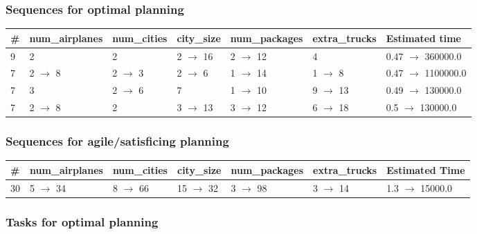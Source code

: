 \documentclass{article}
\begin{document}
                            \subsubsection*{Sequences for optimal planning}

                            \begin{center}
                            \begin{tabular}{@{}l|l|l|l|l|l|l@{}}
                            \# & num\_airplanes & num\_cities & city\_size & num\_packages & extra\_trucks & Estimated time\\\midrule
                            9&2&2&2 $\rightarrow$ 16&2 $\rightarrow$ 12&4&0.47 $\rightarrow$ 360000.0\\
7&2 $\rightarrow$ 8&2 $\rightarrow$ 3&2 $\rightarrow$ 6&1 $\rightarrow$ 14&1 $\rightarrow$ 8&0.47 $\rightarrow$ 1100000.0\\
7&3&2 $\rightarrow$ 6&7&1 $\rightarrow$ 10&9 $\rightarrow$ 13&0.49 $\rightarrow$ 130000.0\\
7&2 $\rightarrow$ 8&2&3 $\rightarrow$ 13&3 $\rightarrow$ 12&6 $\rightarrow$ 18&0.5 $\rightarrow$ 130000.0
                            \end{tabular}
                            \end{center}
                    
                         \subsubsection*{Sequences for agile/satisficing planning}

                        \begin{center}
                        \begin{tabular}{@{}l|l|l|l|l|l|l@{}}
                        \# & num\_airplanes & num\_cities & city\_size & num\_packages & extra\_trucks & Estimated Time\\\midrule
                        30&5 $\rightarrow$ 34&8 $\rightarrow$ 66&15 $\rightarrow$ 32&3 $\rightarrow$ 98&3 $\rightarrow$ 14&1.3 $\rightarrow$ 15000.0
                        \end{tabular}
                        \end{center}
                    
                                \subsubsection*{Tasks for optimal planning}
                                
\end{document}
